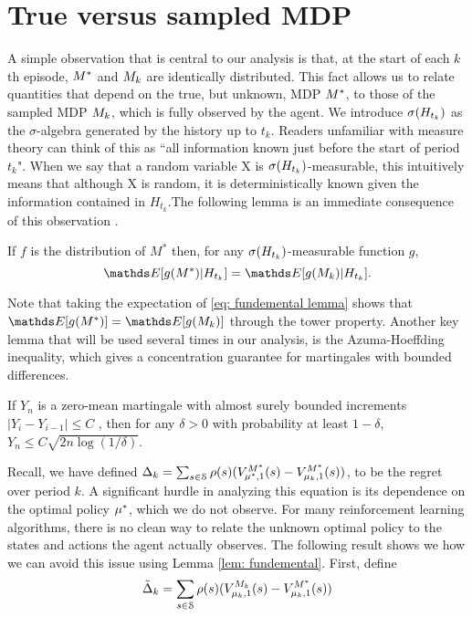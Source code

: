 \section{True versus sampled MDP}

A simple observation that is central to our analysis is that, at the start of each $k$th episode, $M^*$ and ${M_k}$ are identically distributed.
This fact allows us to relate quantities that depend on the true, but unknown, MDP $M^*$, to those of the sampled MDP ${M_k}$, which is fully observed by the agent. We introduce $\sigma ({H}_{t_k})$ as the $\sigma$-algebra generated by the history up to $t_k$. Readers unfamiliar with measure theory can think of this as ``all information known just before the start of period $t_k$". When we say that a random variable X is $\sigma ({H}_{t_k})$-measurable, this intuitively means that although X is random, it is deterministically known given the information contained in $H_{t_k}$.The following lemma is an immediate consequence of this observation \cite{russo2013}.

\begin{lemma}
\label{lem: fundemental}
If $f$ is the distribution of $M^*$ then, for any $\sigma ({H}_{t_k})$-measurable function $g$,
\begin{equation}\label{eq: fundemental lemma}
\Exp [g(\opt) | H_{t_k}] = \Exp[g(\sampled) | H_{t_k}].
\end{equation}
\end{lemma}

Note that taking the expectation of \eqref{eq: fundemental lemma} shows that $\Exp [g(\opt)] = \Exp[g(\sampled)]$ through the tower property. 
Another key lemma that will be used several times in our analysis, is the Azuma-Hoeffding inequality, which gives a concentration guarantee for martingales with bounded differences.

\begin{lemma}
\label{lem: Azuma}
If $Y_n$ is a zero-mean martingale with almost surely bounded increments $|Y_i -Y_{i-1}| \leq C$ , then for any $\delta >0$ with probability at least $1-\delta$, $Y_n \leq C\sqrt{2n \log(1/\delta)}$.
\end{lemma}

Recall, we have defined $\Delta_k = \sum_{s \in \mathcal{S}} \rho(s) (V^{M^*}_{\mu^*, 1}(s) - V^{M^{*}}_{\mu_k, 1}(s))$,  to be the regret over period $k$. A significant hurdle in analyzing this equation is its dependence on the optimal policy $\mu^{*}$, which we do not observe. For many reinforcement learning algorithms, there is no clean way to relate the unknown optimal policy to the states and actions the agent actually observes. The following result shows we how we can avoid this issue using Lemma \ref{lem: fundemental}. First, define 
\begin{equation} \label{eq: deltaTilde}
\tilde{\Delta}_k = \sum_{s \in \mathcal{S}} \rho(s) (V^{M_k}_{\mu_k, 1}(s) - V^{M^{*}}_{\mu_k, 1}(s))
\end{equation}

